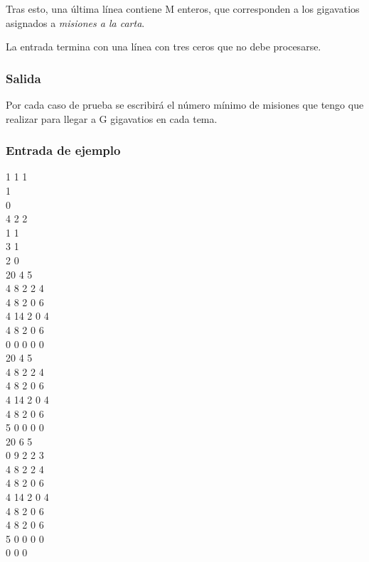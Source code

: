 \documentclass{article}
\newenvironment{caja}{
	\begingroup
	\ttfamily\noindent
	\tabularx{\linewidth}{|X|}\hline
}
{
	\hline\endtabularx
	\normalfont
	\endgroup
}
\begin{document}
	Tras esto, una última línea contiene M enteros, que corresponden a los gigavatios asignados a \textit{misiones a la carta}.
	
	La entrada termina con una línea con tres ceros que no debe procesarse.\\
	
	\subsubsection*{Salida}
	Por cada caso de prueba se escribirá el número mínimo de misiones que tengo que realizar para llegar a G gigavatios en cada tema.\\
	
	\subsubsection*{Entrada de ejemplo}
	\begin{caja}
		1 1 1\\
		1\\
		0\\
		4 2 2\\
		1 1\\
		3 1\\
		2 0\\
		20 4 5\\
		4 8 2 2 4\\
		4 8 2 0 6\\
		4 14 2 0 4\\
		4 8 2 0 6\\
		0 0 0 0 0\\
		20 4 5\\
		4 8 2 2 4\\
		4 8 2 0 6\\
		4 14 2 0 4\\
		4 8 2 0 6\\
		5 0 0 0 0\\
		20 6 5\\
		0 9 2 2 3\\
		4 8 2 2 4\\
		4 8 2 0 6\\
		4 14 2 0 4\\
		4 8 2 0 6\\
		4 8 2 0 6\\
		5 0 0 0 0\\
		0 0 0\\
	\end{caja}\\
	
\end{document}
